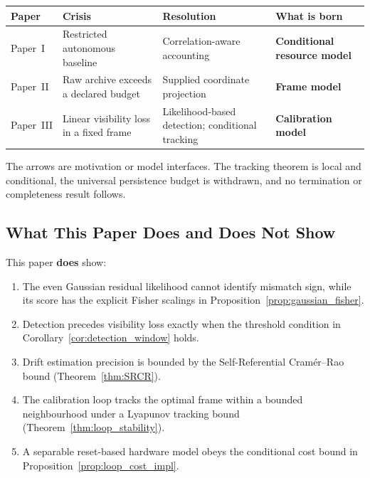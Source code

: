 \documentclass[12pt]{article}
\begin{document}
\begin{center}
\small
\setlength{\tabcolsep}{3pt}%
\begin{tabular}{@{}lP{3.2cm}P{3.8cm}l@{}}
\toprule
\textbf{Paper} & \textbf{Crisis} & \textbf{Resolution}
  & \textbf{What is born} \\
\midrule
Paper~I
  & Restricted autonomous baseline
  & Correlation-aware accounting
  & \textbf{Conditional resource model} \\[3pt]
Paper~II
  & Raw archive exceeds a declared budget
  & Supplied coordinate projection
  & \textbf{Frame model} \\[3pt]
Paper~III
  & Linear visibility loss in a fixed frame
  & Likelihood-based detection; conditional tracking
  & \textbf{Calibration model} \\
\bottomrule
\end{tabular}
\end{center}

The arrows are motivation or model interfaces.  The tracking theorem is
local and conditional, the universal persistence budget is withdrawn,
and no termination or completeness result follows.

\subsection{What This Paper Does and Does Not Show}
\label{subsec:claims}

This paper \textbf{does} show:
\begin{enumerate}
\item The even Gaussian residual likelihood cannot identify mismatch
  sign, while its score has the explicit Fisher scalings in
  Proposition~\ref{prop:gaussian_fisher}.
\item Detection precedes visibility loss exactly when the threshold
  condition in Corollary~\ref{cor:detection_window} holds.
\item Drift estimation precision is bounded by the
  Self-Referential Cram\'{e}r--Rao bound
  (Theorem~\ref{thm:SRCR}).
\item The calibration loop tracks the optimal frame
  within a bounded neighbourhood under a Lyapunov
  tracking bound
  (Theorem~\ref{thm:loop_stability}).
\item A separable reset-based hardware model obeys the conditional cost
  bound in Proposition~\ref{prop:loop_cost_impl}.
\end{enumerate}
\end{document}
